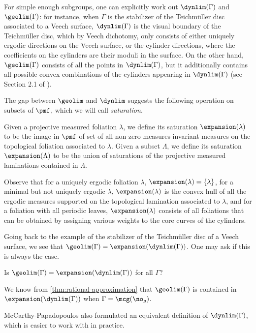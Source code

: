 \documentclass[12pt, reqno]{amsart}
\begin{document}
For simple enough subgroups, one can explicitly work out $\dynlim(\Gamma)$ and $\geolim(\Gamma)$: for instance, when $\Gamma$ is the stabilizer of the Teichmüller disc associated to a Veech surface, $\dynlim(\Gamma)$ is the visual boundary of the Teichmüller disc, which by Veech dichotomy, only consists of either uniquely ergodic directions on the Veech surface, or the cylinder directions, where the coefficients on the cylinders are their moduli in the surface.
On the other hand, $\geolim(\Gamma)$ consists of all the points in $\dynlim(\Gamma)$, but it additionally contains all possible convex combinations of the cylinders appearing in $\dynlim(\Gamma)$ (see Section 2.1 of \cite{2007math......2034K}).

The gap between $\geolim$ and $\dynlim$ suggests the following operation on subsets of $\pmf$, which we will call \emph{saturation}.
\begin{definition}[Saturation]
  Given a projective measured foliation $\lambda$, we define its saturation $\expansion(\lambda)$ to be the image in $\pmf$ of set of all non-zero measures invariant measures on the topological foliation associated to $\lambda$.
  Given a subset $\Lambda$, we define its saturation $\expansion(\Lambda)$ to be the union of saturations of the projective measured laminations contained in $\Lambda$.
\end{definition}
Observe that for a uniquely ergodic foliation $\lambda$, $\expansion(\lambda) = \{\lambda\}$, for a minimal but not uniquely ergodic $\lambda$, $\expansion(\lambda)$ is the convex hull of all the ergodic measures supported on the topological lamination associated to $\lambda$, and for a foliation with all periodic leaves, $\expansion(\lambda)$ consists of all foliations that can be obtained by assigning various weights to the core curves of the cylinders.

Going back to the example of the stabilizer of the Teichmüller disc of a Veech surface, we see that $\geolim(\Gamma) = \expansion(\dynlim(\Gamma))$.
One may ask if this is always the case.
\begin{question}
  Is $\geolim(\Gamma) = \expansion(\dynlim(\Gamma))$ for all $\Gamma$?
\end{question}
We know from \autoref{thm:rational-approximation} that $\geolim(\Gamma)$ is contained in $\expansion(\dynlim(\Gamma))$ when $\Gamma = \mcg(\no_g)$.

McCarthy-Papadopoulos also formulated an equivalent definition of $\dynlim(\Gamma)$, which is easier to work with in practice.
\end{document}
